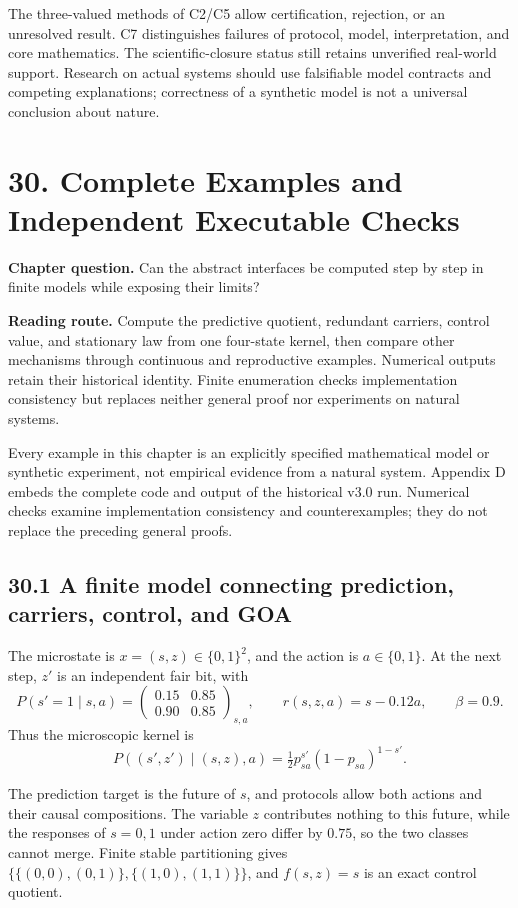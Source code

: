 \documentclass[
  english,
  11pt,
  oneside]{book}
\begin{document}
The three-valued methods of C2/C5 allow certification, rejection, or an unresolved result. C7 distinguishes failures of protocol, model, interpretation, and core mathematics. The scientific-closure status still retains unverified real-world support. Research on actual systems should use falsifiable model contracts and competing explanations; correctness of a synthetic model is not a universal conclusion about nature.

\chapter{30. Complete Examples and Independent Executable Checks}\label{ch-30}

\textbf{Chapter question.} Can the abstract interfaces be computed step by step in finite models while exposing their limits?

\textbf{Reading route.} Compute the predictive quotient, redundant carriers, control value, and stationary law from one four-state kernel, then compare other mechanisms through continuous and reproductive examples. Numerical outputs retain their historical identity. Finite enumeration checks implementation consistency but replaces neither general proof nor experiments on natural systems.

Every example in this chapter is an explicitly specified mathematical model or synthetic experiment, not empirical evidence from a natural system. Appendix D embeds the complete code and output of the historical v3.0 run. Numerical checks examine implementation consistency and counterexamples; they do not replace the preceding general proofs.

\section{30.1 A finite model connecting prediction, carriers, control, and GOA}\label{a-finite-model-connecting-prediction-carriers-control-and-goa}

The microstate is \(x=(s,z)\in\{0,1\}^2\), and the action is \(a\in\{0,1\}\). At the next step, \(z'\) is an independent fair bit, with \[P(s'=1\mid s,a)=
\begin{pmatrix}
0.15&0.85\\
0.90&0.85
\end{pmatrix}_{s,a},
\qquad r(s,z,a)=s-0.12a,\qquad\beta=0.9.\] Thus the microscopic kernel is \[P((s',z')\mid(s,z),a)=\tfrac12
p_{sa}^{s'}(1-p_{sa})^{1-s'}.\]

The prediction target is the future of \(s\), and protocols allow both actions and their causal compositions. The variable \(z\) contributes nothing to this future, while the responses of \(s=0,1\) under action zero differ by \(0.75\), so the two classes cannot merge. Finite stable partitioning gives \(\{\{(0,0),(0,1)\},\{(1,0),(1,1)\}\}\), and \(f(s,z)=s\) is an exact control quotient.
\end{document}
